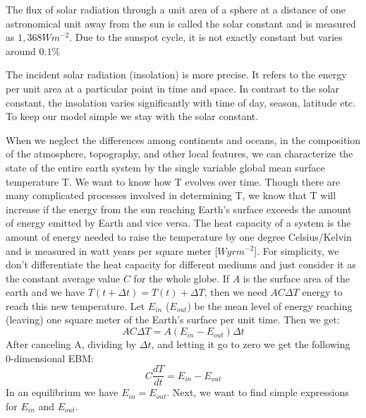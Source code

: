 \documentclass[%
thesis=student,%
coverpage=false,%
titlepage=false,%
headmarks=true, %
english,%
font=libertine, %
math=newpxtx, %
BCOR=5mm,%
coverBCOR=11mm%
]{tumbook}
\begin{document}
The flux of solar radiation through a unit area of a sphere at a distance of one astronomical unit away from the sun is called the solar constant and is measured as $1,368Wm^{-2}$. Due to the sunspot cycle, it is not exactly constant but varies around $0.1\%$

The incident solar radiation (insolation) is more precise. It refers to the energy per unit area at a particular point in time and space. In contrast to the solar constant, the insolation varies significantly with time of day, season, latitude etc. To keep our model simple we stay with the solar constant.

When we neglect the differences among continents and oceans, in the composition of the atmosphere, topography, and other local features, we can characterize the state of the entire earth system by the single variable global mean surface temperature T. We want to know how T evolves over time. Though there are many complicated processes involved in determining T, we know that T will increase if the energy from the sun reaching Earth's surface exceeds the amount of energy emitted by Earth and vice versa.
The heat capacity of a system is the amount of energy needed to raise the temperature by one degree Celsius/Kelvin and is measured in watt years per square meter [$W yr m^{-2}$]. For simplicity, we don't differentiate the heat capacity for different mediums and just consider it as the constant average value $C$ for the whole globe. If $A$ is the surface area of the earth and we have $T(t+\Delta t) = T(t) + \Delta T$, then we need $AC\Delta T$ energy to reach this new temperature.  Let $E_{in}$  ($E_{out}$) be the mean level of energy reaching (leaving) one square meter of the Earth's surface per unit time. Then we get: 
\begin{equation}
AC\Delta T = A(E_{in} - E_{out})\Delta t
\end{equation}
After canceling A, dividing by $\Delta t$, and letting it go to zero we get the following 0-dimensional EBM: 
\begin{equation}
    C\frac{dT}{dt} = E_{in} - E_{out}
\end{equation}
In an equilibrium we have $E_{in} = E_{out}$. Next, we want to find simple expressions for $E_{in}$ and $E_{out}$.
\end{document}
